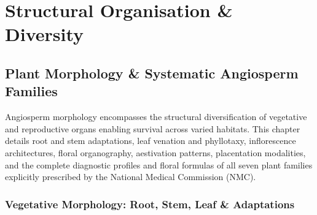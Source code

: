 \documentclass[10pt,twoside,openright]{book}
\begin{document}
\part{Structural Organisation \& Diversity}

\chapter{Plant Morphology \& Systematic Angiosperm Families}

Angiosperm morphology encompasses the structural diversification of vegetative and reproductive organs enabling survival across varied habitats. This chapter details root and stem adaptations, leaf venation and phyllotaxy, inflorescence architectures, floral organography, aestivation patterns, placentation modalities, and the complete diagnostic profiles and floral formulas of all seven plant families explicitly prescribed by the National Medical Commission (NMC).

\section{Vegetative Morphology: Root, Stem, Leaf \& Adaptations}
\end{document}
